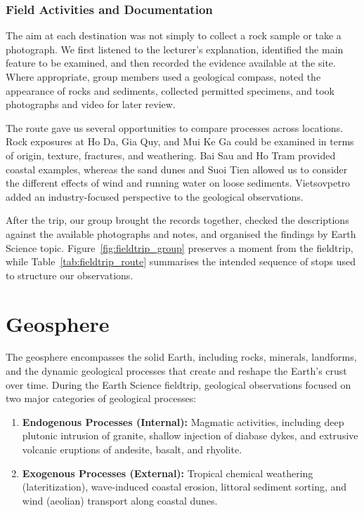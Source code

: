 \documentclass[11pt, a4paper]{article}
\begin{document}
\subsubsection{Field Activities and Documentation}
The aim at each destination was not simply to collect a rock sample or take a photograph. We first listened to the lecturer's explanation, identified the main feature to be examined, and then recorded the evidence available at the site. Where appropriate, group members used a geological compass, noted the appearance of rocks and sediments, collected permitted specimens, and took photographs and video for later review.

The route gave us several opportunities to compare processes across locations. Rock exposures at Ho Da, Gia Quy, and Mui Ke Ga could be examined in terms of origin, texture, fractures, and weathering. Bai Sau and Ho Tram provided coastal examples, whereas the sand dunes and Suoi Tien allowed us to consider the different effects of wind and running water on loose sediments. Vietsovpetro added an industry-focused perspective to the geological observations.

After the trip, our group brought the records together, checked the descriptions against the available photographs and notes, and organised the findings by Earth Science topic. Figure~\ref{fig:fieldtrip_group} preserves a moment from the fieldtrip, while Table~\ref{tab:fieldtrip_route} summarises the intended sequence of stops used to structure our observations.

\section{Geosphere}
\label{sec:geosphere}

The geosphere encompasses the solid Earth, including rocks, minerals, landforms, and the dynamic geological processes that create and reshape the Earth's crust over time. During the Earth Science fieldtrip, geological observations focused on two major categories of geological processes:
\begin{enumerate}
    \item \textbf{Endogenous Processes (Internal):} Magmatic activities, including deep plutonic intrusion of granite, shallow injection of diabase dykes, and extrusive volcanic eruptions of andesite, basalt, and rhyolite.
    \item \textbf{Exogenous Processes (External):} Tropical chemical weathering (lateritization), wave-induced coastal erosion, littoral sediment sorting, and wind (aeolian) transport along coastal dunes.
\end{enumerate}
\end{document}
